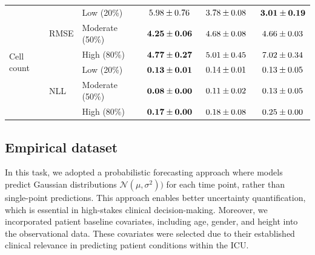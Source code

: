 \documentclass[preprint,12pt]{elsarticle}
\begin{document}
\begin{table}[ht]
\begin{small}
\begin{tabular}{l l l c c c}
\midrule
\multirow{6}{*}{Cell count}
& \multirow{3}{*}{RMSE} & Low (20\%) & $\hspace{\widthof{1}}5.98 \pm 0.76$ & $\hspace{\widthof{1}}3.78 \pm 0.08$ & $\textbf{\hspace{\widthof{1}}3.01} \pm \textbf{0.19}$ \\
& & Moderate (50\%) & $\textbf{\hspace{\widthof{1}}4.25} \pm \textbf{0.06}$ & $\hspace{\widthof{1}}4.68 \pm 0.08$ & $\hspace{\widthof{1}}4.66 \pm 0.03$ \\
& &  High (80\%) & $\textbf{\hspace{\widthof{1}}4.77} \pm \textbf{0.27}$ & $\hspace{\widthof{1}}5.01 \pm 0.45$ & $\hspace{\widthof{1}}7.02 \pm 0.34$ \\
\cmidrule{2-6}
& \multirow{3}{*}{NLL} & Low (20\%) & $\textbf{\hspace{\widthof{1}}0.13} \pm \textbf{0.01}$ & $\hspace{\widthof{1}}0.14 \pm 0.01$ & $\hspace{\widthof{1}}0.13 \pm 0.05$ \\
& & Moderate (50\%)& $\textbf{\hspace{\widthof{1}}0.08} \pm \textbf{0.00}$ & $\hspace{\widthof{1}}0.11 \pm 0.02$ & $\hspace{\widthof{1}}0.13 \pm 0.05$ \\
& & High (80\%) & $\textbf{\hspace{\widthof{1}}0.17} \pm \textbf{0.00}$ & $\hspace{\widthof{1}}0.18 \pm 0.08$ & $\hspace{\widthof{1}}0.25 \pm 0.00$ \\
\bottomrule
\end{tabular}
\end{small}
\end{table}
\subsection{Empirical dataset}
In this task, we adopted a probabilistic forecasting approach where models predict Gaussian distributions $\mathcal{N}(\mu,\sigma^2))$ for each time point, rather than single-point predictions. This approach enables better uncertainty quantification, which is essential in high-stakes clinical decision-making. Moreover, we incorporated patient baseline covariates, including age, gender, and height into the observational data. These covariates were selected due to their established clinical relevance in predicting patient conditions within the ICU. 
\end{document}
